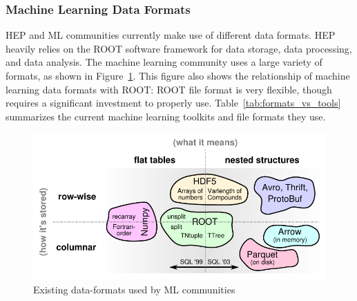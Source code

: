 
\subsubsection{Machine Learning Data Formats}
\label{sec:data_formats}

HEP and ML communities currently make use of different data formats. HEP heavily relies on the ROOT software framework for data storage, data processing, and data analysis. The machine learning community uses a large variety of formats, as shown in Figure~\ref{fig:data-formats}. This figure also shows the relationship of machine learning data formats with ROOT: ROOT file format is very flexible, though requires a significant investment to properly use. Table~\ref{tab:formats_vs_tools} summarizes the current machine learning toolkits and file formats they use.


\begin{figure}[b]
 \centering
 \includegraphics{images/table-of-formats.pdf}
 \caption{Existing data-formats used by ML communities}
 \label{fig:data-formats}
\end{figure}

